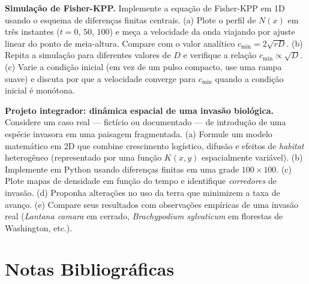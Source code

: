 \begin{exercicio}
\textbf{Simulação de Fisher-KPP.} Implemente a equação de Fisher-KPP em 1D
usando o esquema de diferenças finitas centrais. (a) Plote o perfil de $N(x)$
em três instantes ($t = 0$, $50$, $100$) e meça a velocidade da onda
viajando por ajuste linear do ponto de meia-altura. Compare com o valor
analítico $c_{\min} = 2\sqrt{r D}$. (b) Repita a simulação para diferentes
valores de $D$ e verifique a relação $c_{\min} \propto \sqrt{D}$.
(c) Varie a condição inicial (em vez de um pulso compacto, use uma rampa
suave) e discuta por que a velocidade converge para $c_{\min}$ quando a
condição inicial é monótona.
\end{exercicio}

\begin{exercicio}
\textbf{Projeto integrador: dinâmica espacial de uma invasão biológica.}
Considere um caso real --- fictício ou documentado --- de introdução de uma
espécie invasora em uma paisagem fragmentada. (a) Formule um modelo
matemático em 2D que combine crescimento logístico, difusão e efeitos de
\emph{habitat} heterogêneo (representado por uma função $K(x,y)$ espacialmente
variável). (b) Implemente em Python usando diferenças finitas em uma grade
$100 \times 100$. (c) Plote mapas de densidade em função do tempo e identifique
\emph{corredores} de invasão. (d) Proponha alterações no uso da terra que
minimizem a taxa de avanço. (e) Compare seus resultados com observações
empíricas de uma invasão real (\textit{Lantana camara} em cerrado, \textit{Brachypodium sylvaticum} em florestas de
Washington, etc.).
\end{exercicio}

\section{Notas Bibliográficas}
\label{sec:10-bibliografia}

